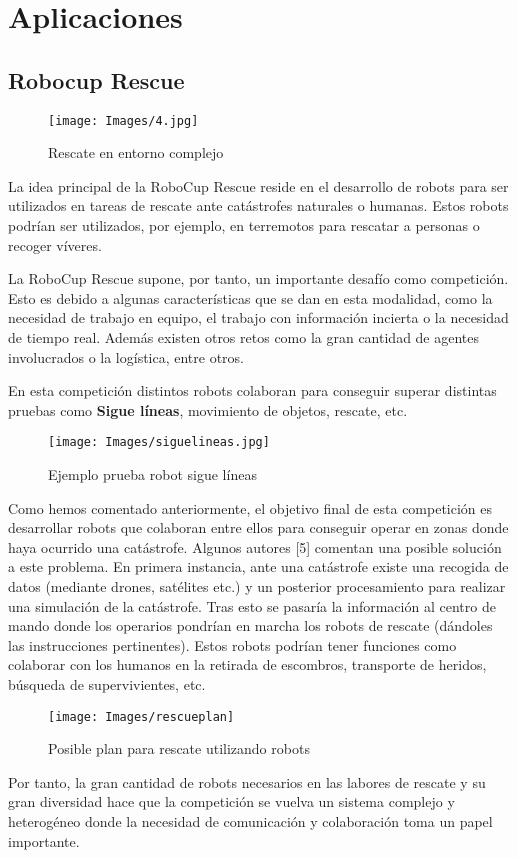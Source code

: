 \documentclass[11pt,oneside,a4paper]{book}
\begin{document}
\section{Aplicaciones}
\subsection{Robocup Rescue}
\begin{figure}[H]
\begin{center}
\texttt{[image: Images/4.jpg]}
\caption{Rescate en entorno complejo}
\end{center}
\end{figure}
La idea principal de la RoboCup Rescue reside en el desarrollo de robots para ser utilizados en tareas de rescate ante catástrofes naturales o humanas. Estos robots podrían ser utilizados, por ejemplo, en terremotos para rescatar a personas o recoger víveres.

La RoboCup Rescue supone, por tanto, un importante desafío como competición. Esto es debido a algunas características que se dan en esta modalidad, como la necesidad de trabajo en equipo, el trabajo con información incierta o la necesidad de tiempo real. Además existen otros retos como la gran cantidad de agentes involucrados o la logística, entre otros.


En esta competición distintos robots colaboran para conseguir superar distintas pruebas como \textbf{Sigue líneas}, movimiento de objetos, rescate, etc.
\begin{figure}[H]
\begin{center}
\texttt{[image: Images/siguelineas.jpg]}
\caption{Ejemplo prueba robot sigue líneas}
\end{center}
\end{figure}
Como hemos comentado anteriormente, el objetivo final de esta competición es desarrollar robots que colaboran entre ellos para conseguir operar en zonas donde haya ocurrido una catástrofe. Algunos autores [5] comentan una posible solución a este problema. En primera instancia, ante una catástrofe existe una recogida de datos (mediante drones, satélites etc.) y un posterior procesamiento para realizar una simulación de la catástrofe. Tras esto se pasaría la información al centro de mando donde los operarios pondrían en marcha los robots de rescate (dándoles las instrucciones pertinentes). Estos robots podrían tener funciones como colaborar con los humanos en la retirada de escombros, transporte de heridos, búsqueda de supervivientes, etc.
\begin{figure}[H]
\begin{center}
\texttt{[image: Images/rescueplan]}
\caption{Posible plan para rescate utilizando robots}
\end{center}
\end{figure}
Por tanto, la gran cantidad de robots necesarios en las labores de rescate y su gran diversidad hace que la competición se vuelva un sistema complejo y heterogéneo donde la necesidad de comunicación y colaboración toma un papel importante.
\end{document}
